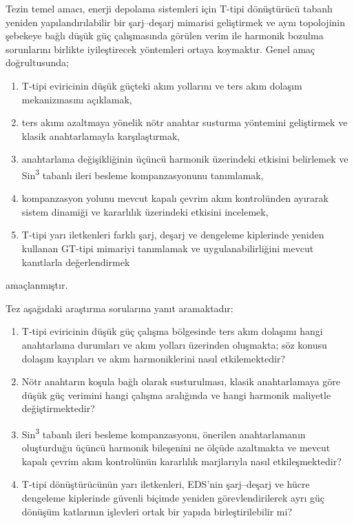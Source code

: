 Tezin temel amacı, enerji depolama sistemleri için T-tipi dönüştürücü tabanlı yeniden yapılandırılabilir bir şarj--deşarj mimarisi geliştirmek ve aynı topolojinin şebekeye bağlı düşük güç çalışmasında görülen verim ile harmonik bozulma sorunlarını birlikte iyileştirecek yöntemleri ortaya koymaktır. Genel amaç doğrultusunda;

\begin{enumerate}
  \item T-tipi eviricinin düşük güçteki akım yollarını ve ters akım dolaşım mekanizmasını açıklamak,
  \item ters akımı azaltmaya yönelik nötr anahtar susturma yöntemini geliştirmek ve klasik anahtarlamayla karşılaştırmak,
  \item anahtarlama değişikliğinin üçüncü harmonik üzerindeki etkisini belirlemek ve Sin\textsuperscript{3} tabanlı ileri besleme kompanzasyonunu tanımlamak,
  \item kompanzasyon yolunu mevcut kapalı çevrim akım kontrolünden ayırarak sistem dinamiği ve kararlılık üzerindeki etkisini incelemek,
  \item T-tipi yarı iletkenleri farklı şarj, deşarj ve dengeleme kiplerinde yeniden kullanan GT-tipi mimariyi tanımlamak ve uygulanabilirliğini mevcut kanıtlarla değerlendirmek
\end{enumerate}
amaçlanmıştır.

Tez aşağıdaki araştırma sorularına yanıt aramaktadır:

\begin{enumerate}[label=AS\arabic*.]
  \item T-tipi eviricinin düşük güç çalışma bölgesinde ters akım dolaşımı hangi anahtarlama durumları ve akım yolları üzerinden oluşmakta; söz konusu dolaşım kayıpları ve akım harmoniklerini nasıl etkilemektedir?
  \item Nötr anahtarın koşula bağlı olarak susturulması, klasik anahtarlamaya göre düşük güç verimini hangi çalışma aralığında ve hangi harmonik maliyetle değiştirmektedir?
  \item Sin\textsuperscript{3} tabanlı ileri besleme kompanzasyonu, önerilen anahtarlamanın oluşturduğu üçüncü harmonik bileşenini ne ölçüde azaltmakta ve mevcut kapalı çevrim akım kontrolünün kararlılık marjlarıyla nasıl etkileşmektedir?
  \item T-tipi dönüştürücünün yarı iletkenleri, EDS'nin şarj--deşarj ve hücre dengeleme kiplerinde güvenli biçimde yeniden görevlendirilerek ayrı güç dönüşüm katlarının işlevleri ortak bir yapıda birleştirilebilir mi?
\end{enumerate}

